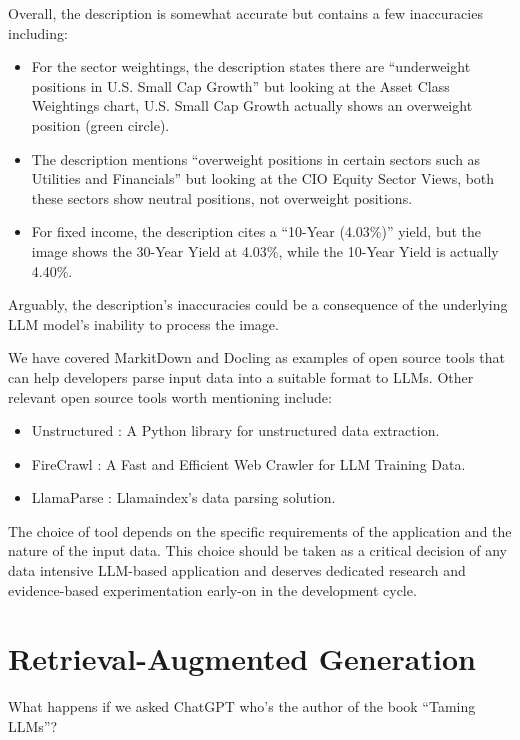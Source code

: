 Overall, the description is somewhat accurate but contains a few inaccuracies including:

\begin{itemize}
    \item For the sector weightings, the description states there are ``underweight positions in U.S. Small Cap Growth'' but looking at the Asset Class Weightings chart, U.S. Small Cap Growth actually shows an overweight position (green circle).
    \item The description mentions ``overweight positions in certain sectors such as Utilities and Financials'' but looking at the CIO Equity Sector Views, both these sectors show neutral positions, not overweight positions.
    \item For fixed income, the description cites a ``10-Year (4.03\%)'' yield, but the image shows the 30-Year Yield at 4.03\%, while the 10-Year Yield is actually 4.40\%.
\end{itemize}

Arguably, the description's inaccuracies could be a consequence of the underlying LLM model's inability to process the image.

We have covered MarkitDown and Docling as examples of open source tools that can help developers parse input data into a suitable format to LLMs. Other relevant open source tools worth mentioning include:
\begin{itemize}
    \item Unstructured : A Python library for unstructured data extraction.
    \item FireCrawl : A Fast and Efficient Web Crawler for LLM Training Data.
    \item LlamaParse : Llamaindex's data parsing solution.
\end{itemize}

The choice of tool depends on the specific requirements of the application and the nature of the input data. This choice should be taken as a critical decision of any data intensive LLM-based application and deserves dedicated research and evidence-based experimentation early-on in the development cycle.
\section{Retrieval-Augmented Generation}

What happens if we asked ChatGPT who's the author of the book ``Taming LLMs''?

